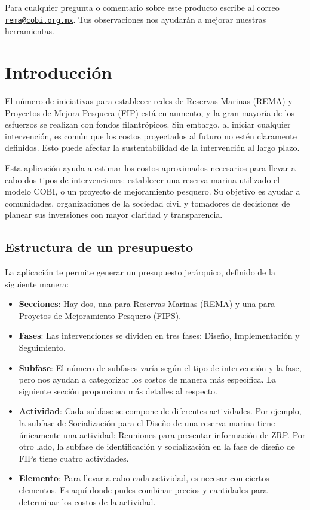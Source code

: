 \documentclass[
]{book}
\begin{document}
Para cualquier pregunta o comentario sobre este producto escribe al correo \href{mailto:rema@cobi.org.mx}{\nolinkurl{rema@cobi.org.mx}}. Tus observaciones nos ayudarán a mejorar nuestras herramientas.

\hypertarget{intro}{%
\chapter{Introducción}\label{intro}}

El número de iniciativas para establecer redes de Reservas Marinas (REMA) y Proyectos de Mejora Pesquera (FIP) está en aumento, y la gran mayoría de los esfuerzos se realizan con fondos filantrópicos. Sin embargo, al iniciar cualquier intervención, es común que los costos proyectados al futuro no estén claramente definidos. Esto puede afectar la sustentabilidad de la intervención al largo plazo.

Esta aplicación ayuda a estimar los costos aproximados necesarios para llevar a cabo dos tipos de intervenciones: establecer una reserva marina utilizado el modelo COBI, o un proyecto de mejoramiento pesquero. Su objetivo es ayudar a comunidades, organizaciones de la sociedad civil y tomadores de decisiones de planear sus inversiones con mayor claridad y transparencia.

\hypertarget{estructura}{%
\section{Estructura de un presupuesto}\label{estructura}}

La aplicación te permite generar un presupuesto jerárquico, definido de la siguiente manera:

\begin{itemize}
\item
  \textbf{Secciones}: Hay dos, una para Reservas Marinas (REMA) y una para Proyctos de Mejoramiento Pesquero (FIPS).
\item
  \textbf{Fases}: Las intervenciones se dividen en tres fases: Diseño, Implementación y Seguimiento.
\item
  \textbf{Subfase}: El número de subfases varía según el tipo de intervención y la fase, pero nos ayudan a categorizar los costos de manera más específica. La siguiente sección proporciona más detalles al respecto.
\item
  \textbf{Actividad}: Cada subfase se compone de diferentes actividades. Por ejemplo, la subfase de Socialización para el Diseño de una reserva marina tiene únicamente una actividad: Reuniones para presentar información de ZRP. Por otro lado, la subfase de identificación y socialización en la fase de diseño de FIPs tiene cuatro actividades.
\item
  \textbf{Elemento}: Para llevar a cabo cada actividad, es necesar con ciertos elementos. Es aquí donde pudes combinar precios y cantidades para determinar los costos de la actividad.
\end{itemize}
\end{document}

